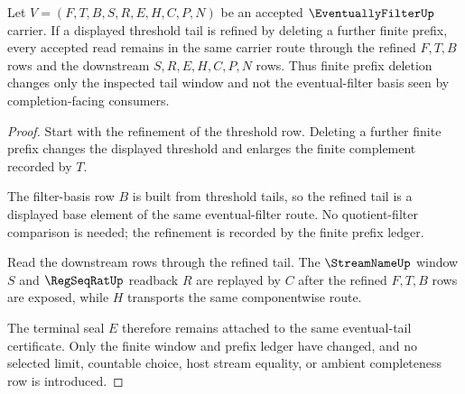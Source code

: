 \begin{theorem}
\label{thm:eventually-filter-tail-refinement}
Let $V=(F,T,B,S,R,E,H,C,P,N)$ be an accepted $\EventuallyFilterUp$ carrier. If a displayed threshold tail is refined by deleting a further finite prefix, every accepted read remains in the same carrier route through the refined $F,T,B$ rows and the downstream $S,R,E,H,C,P,N$ rows. Thus finite prefix deletion changes only the inspected tail window and not the eventual-filter basis seen by completion-facing consumers.
\end{theorem}
\begin{proof}
Start with the refinement of the threshold row. Deleting a further finite prefix changes the displayed threshold and enlarges the finite complement recorded by $T$.

The filter-basis row $B$ is built from threshold tails, so the refined tail is a displayed base element of the same eventual-filter route. No quotient-filter comparison is needed; the refinement is recorded by the finite prefix ledger.

Read the downstream rows through the refined tail. The $\StreamNameUp$ window $S$ and $\RegSeqRatUp$ readback $R$ are replayed by $C$ after the refined $F,T,B$ rows are exposed, while $H$ transports the same componentwise route.

The terminal seal $E$ therefore remains attached to the same eventual-tail certificate. Only the finite window and prefix ledger have changed, and no selected limit, countable choice, host stream equality, or ambient completeness row is introduced.
\end{proof}

